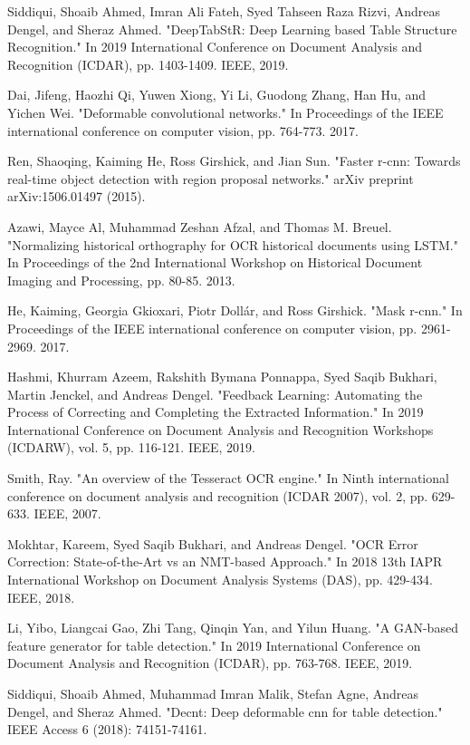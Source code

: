 \documentclass{ieeeaccess}
\begin{document}
\begin{thebibliography}{00}
 Siddiqui, Shoaib Ahmed, Imran Ali Fateh, Syed Tahseen Raza Rizvi, Andreas Dengel, and Sheraz Ahmed. "DeepTabStR: Deep Learning based Table Structure Recognition." In 2019 International Conference on Document Analysis and Recognition (ICDAR), pp. 1403-1409. IEEE, 2019.

 Dai, Jifeng, Haozhi Qi, Yuwen Xiong, Yi Li, Guodong Zhang, Han Hu, and Yichen Wei. "Deformable convolutional networks." In Proceedings of the IEEE international conference on computer vision, pp. 764-773. 2017.


 Ren, Shaoqing, Kaiming He, Ross Girshick, and Jian Sun. "Faster r-cnn: Towards real-time object detection with region proposal networks." arXiv preprint arXiv:1506.01497 (2015).

 Azawi, Mayce Al, Muhammad Zeshan Afzal, and Thomas M. Breuel. "Normalizing historical orthography for OCR historical documents using LSTM." In Proceedings of the 2nd International Workshop on Historical Document Imaging and Processing, pp. 80-85. 2013.

 He, Kaiming, Georgia Gkioxari, Piotr Dollár, and Ross Girshick. "Mask r-cnn." In Proceedings of the IEEE international conference on computer vision, pp. 2961-2969. 2017.

 Hashmi, Khurram Azeem, Rakshith Bymana Ponnappa, Syed Saqib Bukhari, Martin Jenckel, and Andreas Dengel. "Feedback Learning: Automating the Process of Correcting and Completing the Extracted Information." In 2019 International Conference on Document Analysis and Recognition Workshops (ICDARW), vol. 5, pp. 116-121. IEEE, 2019.

 Smith, Ray. "An overview of the Tesseract OCR engine." In Ninth international conference on document analysis and recognition (ICDAR 2007), vol. 2, pp. 629-633. IEEE, 2007.

 Mokhtar, Kareem, Syed Saqib Bukhari, and Andreas Dengel. "OCR Error Correction: State-of-the-Art vs an NMT-based Approach." In 2018 13th IAPR International Workshop on Document Analysis Systems (DAS), pp. 429-434. IEEE, 2018.

 Li, Yibo, Liangcai Gao, Zhi Tang, Qinqin Yan, and Yilun Huang. "A GAN-based feature generator for table detection." In 2019 International Conference on Document Analysis and Recognition (ICDAR), pp. 763-768. IEEE, 2019.

 Siddiqui, Shoaib Ahmed, Muhammad Imran Malik, Stefan Agne, Andreas Dengel, and Sheraz Ahmed. "Decnt: Deep deformable cnn for table detection." IEEE Access 6 (2018): 74151-74161.



\end{thebibliography}
\end{document}
